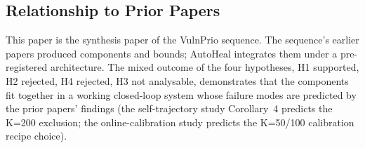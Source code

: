 \subsection{Relationship to Prior Papers}

This paper is the synthesis paper of the VulnPrio sequence. The sequence's
earlier papers produced components and bounds; AutoHeal integrates them
under a pre-registered architecture. The mixed outcome of the
four hypotheses, H1 supported, H2 rejected, H4 rejected, H3 not
analysable, demonstrates that the components fit together in a
working closed-loop system whose failure modes are predicted by
the prior papers' findings (the self-trajectory study Corollary~4 predicts the
K=200 exclusion; the online-calibration study predicts the K=50/100 calibration recipe
choice).
